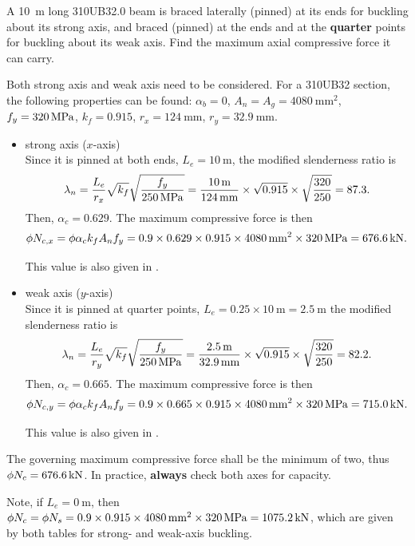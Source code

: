 \begin{exmp}
A \SI{10}{\meter} long 310UB32.0 beam is braced laterally (pinned) at its ends for buckling about its strong axis, and braced (pinned) at the ends and at the \textbf{quarter} points for buckling about its weak axis.
Find the maximum axial compressive force it can carry.
\end{exmp}
\begin{solution}
Both strong axis and weak axis need to be considered.
For a 310UB32 section, the following properties can be found: $\alpha_b=0$, $A_n=A_g=\SI{4080}{\mm^2}$, $f_y=\SI{320}{\mega\pascal}$, $k_f=0.915$, $r_x=\SI{124}{\mm}$, $r_y=\SI{32.9}{\mm}$.
\begin{itemize}
\item strong axis ($x$-axis)\\
Since it is pinned at both ends, $L_e=\SI{10}{\meter}$, the modified slenderness ratio is
\begin{gather*}
\lambda_n=\dfrac{L_e}{r_x}\sqrt{k_f}\sqrt{\dfrac{f_y}{\SI{250}{\mega\pascal}}}=\dfrac{\SI{10}{\meter}}{\SI{124}{\milli\meter}}\times\sqrt{0.915}\times\sqrt{\dfrac{320}{250}}=87.3.
\end{gather*}
Then, $\alpha_c=0.629$.
The maximum compressive force is then
\begin{gather*}
\phi{}N_{c,x}=\phi\alpha_ck_fA_nf_y=0.9\times0.629\times0.915\times\SI{4080}{\milli\meter^2}\times\SI{320}{\mega\pascal}=\SI{676.6}{\kilo\newton}.
\end{gather*}

This value is also given in .
\item weak axis ($y$-axis)\\
Since it is pinned at quarter points, $L_e=0.25\times\SI{10}{\meter}=\SI{2.5}{\meter}$ the modified slenderness ratio is
\begin{gather*}
\lambda_n=\dfrac{L_e}{r_y}\sqrt{k_f}\sqrt{\dfrac{f_y}{\SI{250}{\mega\pascal}}}=\dfrac{\SI{2.5}{\meter}}{\SI{32.9}{\milli\meter}}\times\sqrt{0.915}\times\sqrt{\dfrac{320}{250}}=82.2.
\end{gather*}
Then, $\alpha_c=0.665$.
The maximum compressive force is then
\begin{gather*}
\phi{}N_{c,y}=\phi\alpha_ck_fA_nf_y=0.9\times0.665\times0.915\times\SI{4080}{\milli\meter^2}\times\SI{320}{\mega\pascal}=\SI{715.0}{\kilo\newton}.
\end{gather*}

This value is also given in .
\end{itemize}
The governing maximum compressive force shall be the minimum of two, thus $\phi{}N_c=\SI{676.6}{\kilo\newton}$.
In practice, \textbf{always} check both axes for capacity.

Note, if $L_e=\SI{0}{\m}$, then $\phi{}N_c=\phi{}N_s=0.9\times0.915\times\SI{4080}{\milli\meter^2}\times\SI{320}{\mega\pascal}=\SI{1075.2}{\kilo\newton}$, which are given by both tables for strong- and weak-axis buckling.
\end{solution}
